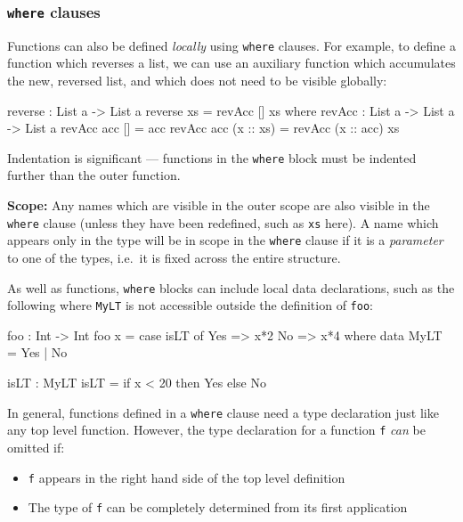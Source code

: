 \subsubsection*{\texttt{where} clauses}

Functions can also be defined \emph{locally} using \texttt{where} clauses.
For example, to define a function which reverses a list, we can use an auxiliary function which accumulates the new, reversed list, and which does not need to be visible globally:

\begin{code}
reverse : List a -> List a
reverse xs = revAcc [] xs where
  revAcc : List a -> List a -> List a
  revAcc acc [] = acc
  revAcc acc (x :: xs) = revAcc (x :: acc) xs
\end{code}

\noindent
Indentation is significant --- functions in the \texttt{where} block must be indented further than the outer function.

\textbf{Scope:}
Any names which are visible in the outer scope are also visible in the \texttt{where} clause (unless they have been redefined, such as \texttt{xs} here).
A name which appears only in the type will be in scope in the \texttt{where} clause if it is a \emph{parameter} to one of the types, i.e.\ it is fixed across the entire structure.

As well as functions, \texttt{where} blocks can include local data declarations, such as the following where \texttt{MyLT} is not accessible outside the definition of \texttt{foo}:

\begin{code}
foo : Int -> Int
foo x = case isLT of
            Yes => x*2
            No => x*4
    where
       data MyLT = Yes | No

       isLT : MyLT
       isLT = if x < 20 then Yes else No
\end{code}

\noindent
In general, functions defined in a \texttt{where} clause need a type declaration just like any top level function.
However, the type declaration for a function \texttt{f} \emph{can} be omitted if:

\begin{itemize}
\item \texttt{f} appears in the right hand side of the top level definition
\item The type of \texttt{f} can be completely determined from its first application
\end{itemize}

